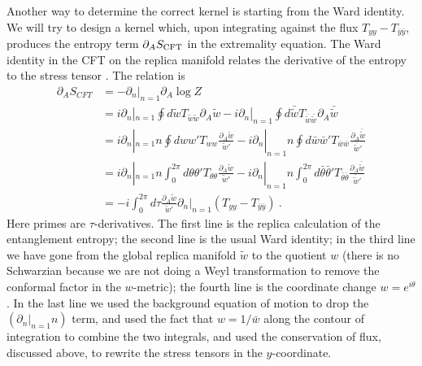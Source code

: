 \documentclass[11pt,oneside,letterpaper]{article}
\newcommand{\p}{\partial}
\renewcommand{\p}{\partial}
\numberwithin{equation}{section}
\def\p{{\phi}}
\renewcommand{\p}{\partial}
\newcommand{\by}{\bar{y}}
\begin{document}
\begin{spacing}{1.1}
Another way to determine the correct kernel is starting from the Ward identity. We will try to design a kernel which, upon integrating against the flux $T_{yy} - T_{\by \by}$, produces the entropy term $\p_A S_{\rm CFT}$ in the extremality equation. The Ward identity in the CFT on the replica manifold relates the derivative of the entropy to the stress tensor \cite{Calabrese:2004eu, Calabrese:2009qy}. The relation is 
\newcommand{\btheta}{\bar{\theta}}
\begin{align}\label{Wardderivation}
\p_A S_{CFT} &=  -\p_n|_{n=1} \p_A \log Z \\
\label{eq:ward}&= i \p_n|_{n=1} \oint d\tilde{w} T_{\tilde w \tilde w}\p_A \tilde{w} - i \p_n|_{n=1} \oint d\bar{\tilde{w}} T_{\bar{\tilde{w}} \bar{\tilde{w}}} \p_A \bar{\tilde{w}}  \\
\label{eq:ward2}&= i \p_n|_{n=1} n \oint dw w' T_{ww} \frac{\p_A \tilde{w}}{\tilde{w}'} - i \p_n|_{n=1} n \oint d\bar{w} \bar{w}' T_{\bar{w} \bar{w}} \frac{\p_A \bar{\tilde{w}}}{\bar{\tilde{w}}'} \\
&= i \p_n|_{n=1} n \int_0^{2\pi} d\theta \theta' T_{\theta\theta} \frac{\p_A \tilde{w}}{\tilde{w}'}  - i \p_n|_{n=1} n \int_0^{2\pi} d\btheta \btheta' T_{\btheta\btheta} 
\frac{\p_A \bar{\tilde{w}}}{\bar{\tilde{w}}'}\\
&= - i \int_0^{2\pi}d\tau  \frac{\p_A \tilde{w}}{\tilde{w}'} \p_n|_{n=1}(T_{yy} - T_{\by \by} )  \ .
\end{align}
Here primes are $\tau$-derivatives. The first line is the replica calculation of the entanglement entropy; the second line is the usual Ward identity; in the third line we have gone from the global replica manifold $\tilde{w}$ to the quotient $w$ (there is no Schwarzian because we are not doing a Weyl transformation to remove the conformal factor in the $w$-metric); the fourth line is the coordinate change $w=e^{i\theta}$. In the last line we used the background equation of motion to drop the $(\p_n|_{n=1} n)$ term, and used the fact that $w = 1/\bar{w}$ along the contour of integration to combine the two integrals, and used the conservation of flux, discussed above, to rewrite the stress tensors in the $y$-coordinate.


\end{spacing}
\end{document}
